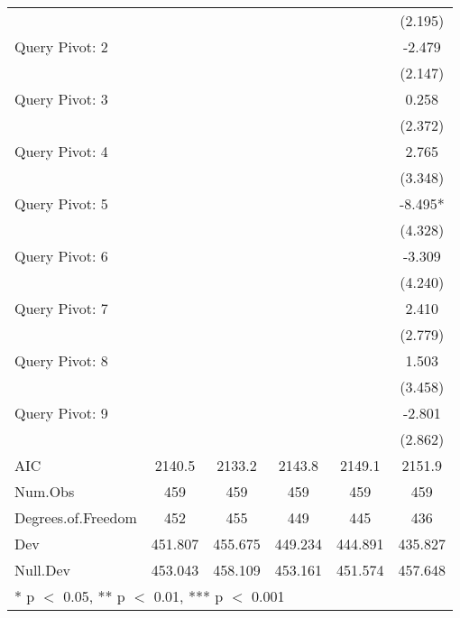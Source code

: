 \begin{table}
\begin{tabular}[t]{lccccc}
 &  &  &  &  & (2.195)\\
Query Pivot: 2 &  &  &  &  & -2.479\\
 &  &  &  &  & (2.147)\\
Query Pivot: 3 &  &  &  &  & 0.258\\
 &  &  &  &  & (2.372)\\
Query Pivot: 4 &  &  &  &  & 2.765\\
 &  &  &  &  & (3.348)\\
Query Pivot: 5 &  &  &  &  & -8.495*\\
 &  &  &  &  & (4.328)\\
Query Pivot: 6 &  &  &  &  & -3.309\\
 &  &  &  &  & (4.240)\\
Query Pivot: 7 &  &  &  &  & 2.410\\
 &  &  &  &  & (2.779)\\
Query Pivot: 8 &  &  &  &  & 1.503\\
 &  &  &  &  & (3.458)\\
Query Pivot: 9 &  &  &  &  & -2.801\\
 &  &  &  &  & (2.862)\\
\midrule
AIC & 2140.5 & 2133.2 & 2143.8 & 2149.1 & 2151.9\\
Num.Obs & 459 & 459 & 459 & 459 & 459\\
Degrees.of.Freedom & 452 & 455 & 449 & 445 & 436\\
Dev & 451.807 & 455.675 & 449.234 & 444.891 & 435.827\\
Null.Dev & 453.043 & 458.109 & 453.161 & 451.574 & 457.648\\
\bottomrule
\multicolumn{6}{l}{\rule{0pt}{1em}* p $<$ 0.05, ** p $<$ 0.01, *** p $<$ 0.001}\\
\end{tabular}
\end{table}

